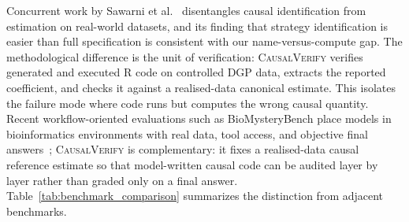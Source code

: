 \documentclass{article}
\newcommand{\bench}{\textsc{CausalVerify}}
\begin{document}
Concurrent work by Sawarni et
al.~\citep{sawarni2026causalreasoningbenchmark} disentangles causal
identification from estimation on real-world datasets, and its finding
that strategy identification is easier than full specification is
consistent with our name-versus-compute gap. The methodological
difference is the unit of verification: \textsc{CausalVerify} verifies
generated and executed R code on controlled DGP data, extracts the
reported coefficient, and checks it against a realised-data canonical
estimate. This isolates the failure mode where code runs but computes
the wrong causal quantity. Recent workflow-oriented evaluations such as
BioMysteryBench
place models in bioinformatics environments with real data, tool
access, and objective final
answers~\citep{anthropic2026biomysterybench}; \bench{} is complementary:
it fixes a realised-data causal reference estimate so that
model-written causal code can be audited layer by layer rather than
graded only on a final answer. Table~\ref{tab:benchmark_comparison}
summarizes the distinction from adjacent benchmarks.
\end{document}
